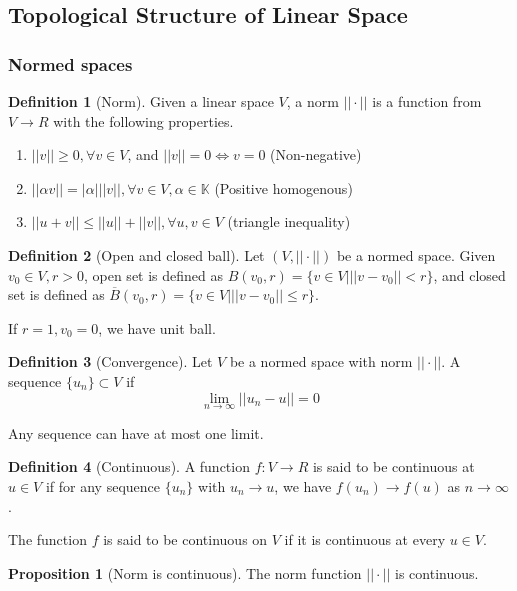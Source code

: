 \documentclass{article}
\theoremstyle{definition}
\newtheorem{definition}{Definition}[section]
\newtheorem{proposition}{Proposition}[section]
\begin{document}
\subsection{Topological Structure of Linear Space}

\subsubsection{Normed spaces}
\begin{definition}[Norm]
Given a linear space $V$, a norm $|| \cdot ||$ is a function from $V \to R$ with the following properties.
\begin{enumerate}
	\item $||v|| \geq 0, \forall v\in V$, and $||v||=0 \iff v=0$ (Non-negative)
	\item $||\alpha v||=|\alpha|||v||,\forall v\in V, \alpha \in \mathbb{K}$ (Positive homogenous)
	\item $||u+v|| \leq ||u||+||v||, \forall u, v \in V$ (triangle inequality)
\end{enumerate}
\end{definition}


\begin{definition}[Open and closed ball]
Let $(V, ||\cdot||)$ be a normed space. Given $v_0 \in V, r>0$, open set is defined as $B(v_0,r)=\{v \in V | ||v-v_0||<r \}$, and closed set is defined as $\overline{B}(v_0,r)=\{v \in V | ||v-v_0||\leq r\}$.
\end{definition}

If $r=1, v_0=0$, we have unit ball.

\begin{definition}[Convergence]
Let $V$ be a normed space with norm $||\cdot||$. A sequence $\{u_n\} \subset V$ if 
\begin{equation}
\lim_{n \to \infty} ||u_n-u||=0
\end{equation}
\end{definition}
Any sequence can have at most one limit.

\begin{definition}[Continuous]
A function $f:V\to R$ is said to be continuous at $u\in V$ if for any sequence $\{u_n\}$ with $u_n \to u$, we have $f(u_n) \to f(u)$ as $n \to \infty$. 
\end{definition}

The function $f$ is said to be continuous on $V$ if it is continuous at every $u\in V$.


\begin{proposition}[Norm is continuous]
The norm function $||\cdot||$ is continuous.
\end{proposition}
\end{document}

